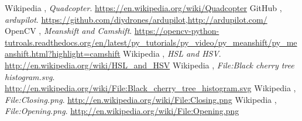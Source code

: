\begin{thebibliography}{9}

  Wikipedia ,
  \emph{Quadcopter}.
  \url{https://en.wikipedia.org/wiki/Quadcopter}
  GitHub ,
  \emph{ardupilot}.
  \url{https://github.com/diydrones/ardupilot},\url{http://ardupilot.com/}
  OpenCV ,
  \emph{Meanshift and Camshift}.
  \url{https://opencv-python-tutroals.readthedocs.org/en/latest/py_tutorials/py_video/py_meanshift/py_meanshift.html?highlight=camshift}
  Wikipedia ,
  \emph{HSL and HSV}.
  \url{http://en.wikipedia.org/wiki/HSL_and_HSV}
  Wikipedia ,
  \emph{File:Black cherry tree histogram.svg}.
  \url{http://en.wikipedia.org/wiki/File:Black_cherry_tree_histogram.svg}
  Wikipedia ,
  \emph{File:Closing.png}.
  \url{http://en.wikipedia.org/wiki/File:Closing.png}
  Wikipedia ,
  \emph{File:Opening.png}.
  \url{http://en.wikipedia.org/wiki/File:Opening.png}
\end{thebibliography}
